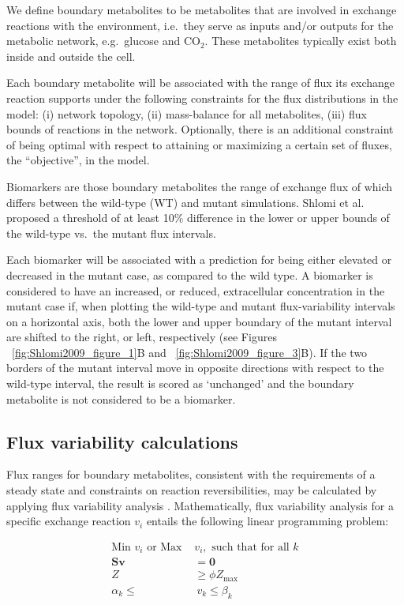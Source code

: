 \documentclass[10pt,a4paper,onecolumn]{article}
\begin{document}
We define boundary metabolites to be metabolites that are involved in
exchange reactions with the environment, i.e.~they serve as inputs
and/or outputs for the metabolic network, e.g.~glucose and CO\(_2\).
These metabolites typically exist both inside and outside the cell.

Each boundary metabolite will be associated with the range of flux its
exchange reaction supports under the following constraints for the flux
distributions in the model: (i) network topology, (ii) mass-balance for
all metabolites, (iii) flux bounds of reactions in the network.
Optionally, there is an additional constraint of being optimal with
respect to attaining or maximizing a certain set of fluxes, the
``objective'', in the model.

Biomarkers are those boundary metabolites the range of exchange flux of
which differs between the wild-type (WT) and mutant simulations. Shlomi
et al. proposed a threshold of at least 10\% difference in the lower or
upper bounds of the wild-type vs.~the mutant flux intervals.

Each biomarker will be associated with a prediction for being either
elevated or decreased in the mutant case, as compared to the wild type.
A biomarker is considered to have an increased, or reduced,
extracellular concentration in the mutant case if, when plotting the
wild-type and mutant flux-variability intervals on a horizontal axis,
both the lower and upper boundary of the mutant interval are shifted to
the right, or left, respectively (see Figures
~\ref{fig:Shlomi2009_figure_1}B and ~\ref{fig:Shlomi2009_figure_3}B). If
the two borders of the mutant interval move in opposite directions with
respect to the wild-type interval, the result is scored as `unchanged'
and the boundary metabolite is not considered to be a biomarker.

\subsection{Flux variability
calculations}\label{flux-variability-calculations}

Flux ranges for boundary metabolites, consistent with the requirements
of a steady state and constraints on reaction reversibilities, may be
calculated by applying flux variability analysis
\autocite{Mahadevan2003}. Mathematically, flux variability analysis for
a specific exchange reaction \(v_i\) entails the following linear
programming problem:

\begin{align}
\text{Min } v_i \text{ or Max } &v_i, \text{ such that for all } k \nonumber \\
\bm{S} \bm{v} &= \bm{0} \nonumber \\
Z  &\geq \phi Z_{\text{max}} \nonumber \\
\alpha_k \leq & ~ v_k \leq \beta_k 
\end{align}
\end{document}
